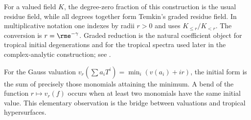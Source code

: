 For a valued field $K$, the degree-zero fraction of this construction is the
usual residue field, while all degrees together form Temkin's graded residue
field. In multiplicative notation one indexes by radii $r>0$ and uses
$K_{\leq r}/K_{<r}$. The conversion is $r=\rme^{-\gamma}$. Graded reduction is
the natural coefficient object for tropical initial degenerations and for
the tropical spectra used later in the complex-analytic construction; see
\cite{MP24}.

\begin{example}\label{ex:gauss-initial-forms}
For the Gauss valuation
$v_r(\sum a_iT^i)=\min_i(v(a_i)+ir)$, the initial form is the sum of precisely
those monomials attaining the minimum. A bend of the function
$r\mapsto v_r(f)$ occurs when at least two monomials have the same initial
value. This elementary observation is the bridge between valuations and
tropical hypersurfaces.
\end{example}

